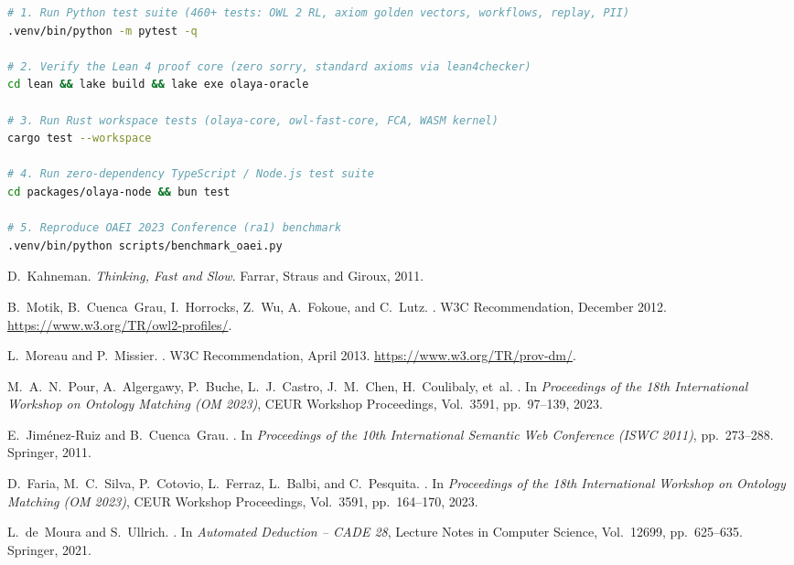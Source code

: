\documentclass[11pt,a4paper]{article}
\begin{document}
\begin{lstlisting}[style=olayacode,language=bash]
# 1. Run Python test suite (460+ tests: OWL 2 RL, axiom golden vectors, workflows, replay, PII)
.venv/bin/python -m pytest -q

# 2. Verify the Lean 4 proof core (zero sorry, standard axioms via lean4checker)
cd lean && lake build && lake exe olaya-oracle

# 3. Run Rust workspace tests (olaya-core, owl-fast-core, FCA, WASM kernel)
cargo test --workspace

# 4. Run zero-dependency TypeScript / Node.js test suite
cd packages/olaya-node && bun test

# 5. Reproduce OAEI 2023 Conference (ra1) benchmark
.venv/bin/python scripts/benchmark_oaei.py
\end{lstlisting}

\begin{thebibliography}{9}

D.~Kahneman.
\newblock \emph{Thinking, Fast and Slow}.
\newblock Farrar, Straus and Giroux, 2011.

B.~Motik, B.~Cuenca~Grau, I.~Horrocks, Z.~Wu, A.~Fokoue, and C.~Lutz.
.
\newblock W3C Recommendation, December 2012. \url{https://www.w3.org/TR/owl2-profiles/}.

L.~Moreau and P.~Missier.
.
\newblock W3C Recommendation, April 2013. \url{https://www.w3.org/TR/prov-dm/}.

M.~A.~N.~Pour, A.~Algergawy, P.~Buche, L.~J.~Castro, J.~M.~Chen, H.~Coulibaly, et~al.
.
\newblock In \emph{Proceedings of the 18th International Workshop on Ontology Matching (OM 2023)}, CEUR Workshop Proceedings, Vol.~3591, pp.~97--139, 2023.

E.~Jim{\'e}nez-Ruiz and B.~Cuenca~Grau.
.
\newblock In \emph{Proceedings of the 10th International Semantic Web Conference (ISWC 2011)}, pp.~273--288. Springer, 2011.

D.~Faria, M.~C.~Silva, P.~Cotovio, L.~Ferraz, L.~Balbi, and C.~Pesquita.
.
\newblock In \emph{Proceedings of the 18th International Workshop on Ontology Matching (OM 2023)}, CEUR Workshop Proceedings, Vol.~3591, pp.~164--170, 2023.

L.~de~Moura and S.~Ullrich.
.
\newblock In \emph{Automated Deduction -- CADE 28}, Lecture Notes in Computer Science, Vol.~12699, pp.~625--635. Springer, 2021.

\end{thebibliography}
\end{document}
